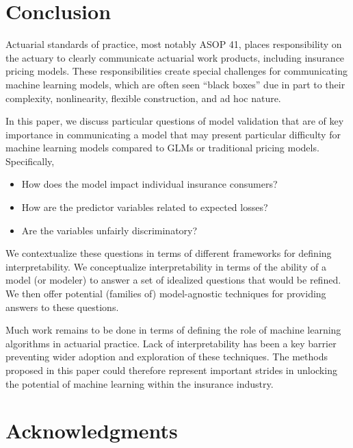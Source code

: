 \documentclass[preprint, 3p, twocolumn, letterpaper, 10pt]{elsarticle} %
\providecommand{\tightlist}{%
  \setlength{\itemsep}{0pt}\setlength{\parskip}{0pt}}
\begin{document}
\hypertarget{conclusion}{%
\section{Conclusion}\label{conclusion}}

Actuarial standards of practice, most notably ASOP 41, places responsibility on
the actuary to clearly communicate actuarial work products, including insurance
pricing models. These responsibilities create special challenges for
communicating machine learning models, which are often seen ``black boxes'' due
in part to their complexity, nonlinearity, flexible construction, and ad hoc
nature.

In this paper, we discuss particular questions of model validation that are
of key importance in communicating a model that may present particular
difficulty for machine learning models compared to GLMs or traditional pricing
models. Specifically,

\begin{itemize}
\tightlist
\item
  How does the model impact individual insurance consumers?
\item
  How are the predictor variables related to expected losses?
\item
  Are the variables unfairly discriminatory?
\end{itemize}

We contextualize these questions in terms of different frameworks for defining
interpretability. We conceptualize interpretability in terms of the ability of
a model (or modeler) to answer a set of idealized questions that would be
refined. We then offer potential (families of) model-agnostic techniques for
providing answers to these questions.

Much work remains to be done in terms of defining the role of machine learning
algorithms in actuarial practice. Lack of interpretability has been a key
barrier preventing wider adoption and exploration of these techniques. The
methods proposed in this paper could therefore represent important strides in
unlocking the potential of machine learning within the insurance industry.

\hypertarget{acknowledgments}{%
\section*{Acknowledgments}\label{acknowledgments}}
\end{document}
